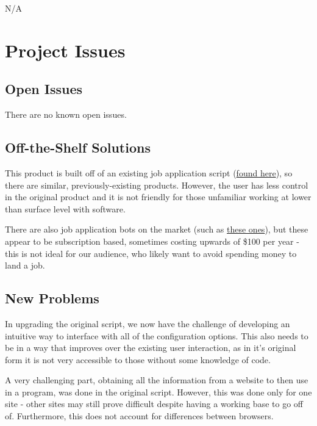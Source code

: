 \documentclass[12pt, titlepage]{article}
\begin{document}
N/A

\section{Project Issues}

\subsection{Open Issues}

There are no known open issues.

\subsection{Off-the-Shelf Solutions}

This product is built off of an existing job application script (\href{https://github.com/harshibar/common-intern}{found here}), so there are similar, previously-existing products. However, the user has less control in the original product and it is not friendly for those unfamiliar working at lower than surface level with software.

There are also job application bots on the market (such as \href{https://www.websautomation.com/jobs-board-bot/}{these ones}), but these appear to be subscription based, sometimes costing upwards of \$100 per year - this is not ideal for our audience, who likely want to avoid spending money to land a job. %

\subsection{New Problems}

In upgrading the original script, we now have the challenge of developing an intuitive way to interface with all of the configuration options. This also needs to be in a way that improves over the existing user interaction, as in it's original form it is not very accessible to those without some knowledge of code.

A very challenging part, obtaining all the information from a website to then use in a program, was done in the original script. However, this was done only for one site - other sites may still prove difficult despite having a working base to go off of. Furthermore, this does not account for differences between browsers.
\end{document}
